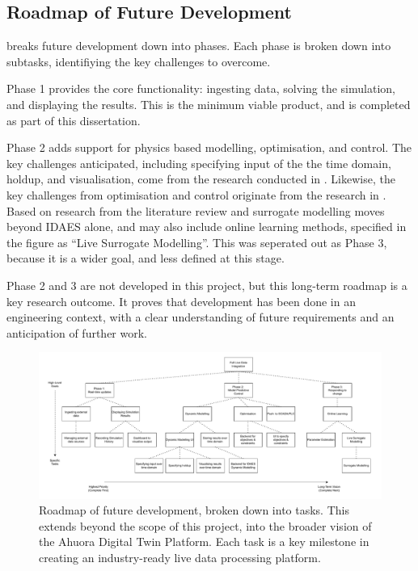 \documentclass[12pt]{report}
\begin{document}
\begin{appendices}

\chapter{Roadmap of Future Development} \label{app:roadmap}

 breaks future development down into phases. Each phase is broken down into subtasks, identifiying the key challenges to overcome.

Phase 1 provides the core functionality: ingesting data, solving the simulation, and displaying the results. This is the minimum viable product, and is completed as part of this dissertation.

Phase 2 adds support for physics based modelling, optimisation, and control. The key challenges anticipated, including specifying input of the the time domain, holdup, and visualisation, come from the research conducted in . Likewise, the key challenges from optimisation and control originate from the research in . Based on research from the literature review and  surrogate modelling moves beyond IDAES alone, and may also include online learning methods, specified in the figure as ``Live Surrogate Modelling''. This was seperated out as Phase 3, because it is a wider goal, and less defined at this stage. 

Phase 2 and 3 are not developed in this project, but this long-term roadmap is a key research outcome. It proves that development has been done in an engineering context, with a clear understanding of future requirements and an anticipation of further work.

\begin{landscape}
    \begin{figure}
        \centering
        \includegraphics[width=1.5\textwidth]{roadmap.pdf}
        \caption{Roadmap of future development, broken down into tasks. This extends beyond the scope of this project, into the broader vision of the Ahuora Digital Twin Platform. Each task is a key milestone in creating an industry-ready live data processing platform.}
        \label{fig:development_flowchart}
    \end{figure}
\end{landscape}





\end{appendices}
\end{document}
